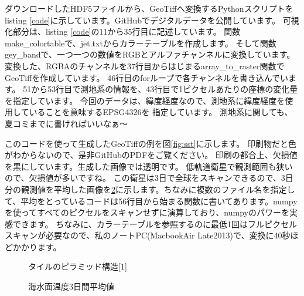 ダウンロードしたHDF5ファイルから、GeoTiffへ変換するPythonスクリプトをlisting \ref{code}に示しています。GitHubでデジタルデータを公開しています。
可視化部分は、listing \ref{code}の11から35行目に記述しています。
関数make\_colortableで、jet.txtからカラーテーブルを作成します。
そして関数gey\_bandで、一つ一つの数値をRGBとアルファチャンネルに変換しています。
変換した、RGBAのチャンネルを37行目からはじまるarray\_to\_raster関数でGeoTiffを作成しています。
46行目のforループで各チャンネルを書き込んでいます。
51から53行目で測地系の情報を、43行目で1ピクセルあたりの座標の変化量を指定しています。
今回のデータは、緯度経度なので、測地系に緯度経度を使用していることを意味するEPSG4326を
指定しています。
測地系に関しても、夏コミまでに書ければいいなぁ〜

このコードを使って生成したGeoTiffの例を図\ref{fig:sst}に示します。
印刷物だと色がわからないので、是非GitHubのPDFをご覧ください。
印刷の都合上、欠損値を黒にしています。生成した画像では透明です。
低軌道衛星で観測範囲も狭いので、欠損値が多いですね。
この衛星は3日で全球をスキャンできるので、3日分の観測値を平均した画像を\ref{fig:sst-ave}に示します。ちなみに複数のファイル名を指定して、平均をとっているコードは56行目から始まる関数に書いてあります。numpyを使ってすべてのピクセルをスキャンせずに演算しており、numpyのパワーを実感できます。
ちなみに、カラーテーブルを参照するのに最低1回はフルピクセルスキャンが必要なので、私のノートPC(MacbookAir Late2013)で、変換に40秒ほどかかります。


\begin{figure}[t]
\centering
{}
\caption{タイルのピラミッド構造[1]}
\label{fig:tile_pylamid}
\end{figure}

\begin{figure}[t]
\centering
{}
\caption{海水面温度3日間平均値}
\label{fig:sst-ave}
\end{figure}

